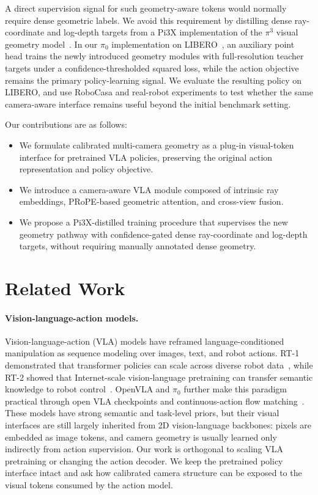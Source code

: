 \documentclass{article}
\begin{document}
A direct supervision signal for such geometry-aware tokens would normally require dense geometric labels. We avoid this requirement by distilling dense ray-coordinate and log-depth targets from a Pi3X implementation of the $\pi^3$ visual geometry model~\citep{wang2025pi3}. In our $\pi_0$ implementation on LIBERO~\citep{liu2023libero}, an auxiliary point head trains the newly introduced geometry modules with full-resolution teacher targets under a confidence-thresholded squared loss, while the action objective remains the primary policy-learning signal. We evaluate the resulting policy on LIBERO, and use RoboCasa and real-robot experiments to test whether the same camera-aware interface remains useful beyond the initial benchmark setting.

Our contributions are as follows:
\begin{itemize}
    \item We formulate calibrated multi-camera geometry as a plug-in visual-token interface for pretrained VLA policies, preserving the original action representation and policy objective.
    \item We introduce a camera-aware VLA module composed of intrinsic ray embeddings, PRoPE-based geometric attention, and cross-view fusion.
    \item We propose a Pi3X-distilled training procedure that supervises the new geometry pathway with confidence-gated dense ray-coordinate and log-depth targets, without requiring manually annotated dense geometry.
\end{itemize}





\section{Related Work}
\paragraph{Vision-language-action models.}
Vision-language-action (VLA) models have reframed language-conditioned manipulation as sequence modeling over images, text, and robot actions. RT-1 demonstrated that transformer policies can scale across diverse robot data~\citep{brohan2023rt1}, while RT-2 showed that Internet-scale vision-language pretraining can transfer semantic knowledge to robot control~\citep{zitkovich2023rt2}. OpenVLA and $\pi_0$ further make this paradigm practical through open VLA checkpoints and continuous-action flow matching~\citep{kim2024openvla,black2025pi0}. These models have strong semantic and task-level priors, but their visual interfaces are still largely inherited from 2D vision-language backbones: pixels are embedded as image tokens, and camera geometry is usually learned only indirectly from action supervision. Our work is orthogonal to scaling VLA pretraining or changing the action decoder. We keep the pretrained policy interface intact and ask how calibrated camera structure can be exposed to the visual tokens consumed by the action model.
\end{document}
